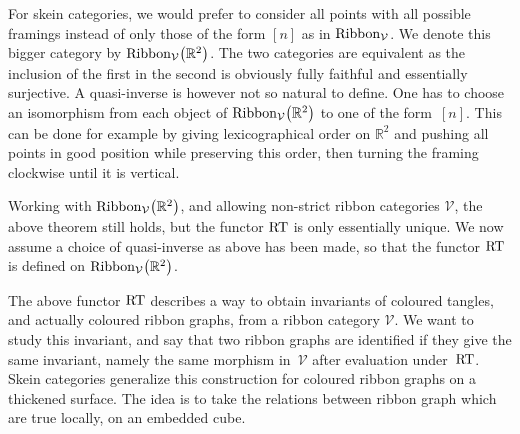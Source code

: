 \documentclass[pdftex]{sigma}%
\numberwithin{equation}{section}
\begin{document}
\begin{Remark}\label{rmkEqCatSkR2VV}
For skein categories, we would prefer to consider all points with all possible framings instead of only those of the form $[n]$ as in ${\rm Ribbon}_\mathcal{V}$. We denote this bigger category by ${\rm Ribbon}_\mathcal{V}\big(\mathbb{R}^2\big)$. The two categories are equivalent as the inclusion of the first in the second is obviously fully faithful and essentially surjective. A quasi-inverse is however not so natural to define. One has to choose an isomorphism from each object of ${\rm Ribbon}_\mathcal{V}\big(\mathbb{R}^2\big)$ to one of the form~$[n]$. This can be done for example by giving lexicographical order on $\mathbb{R}^2$ and pushing all points in good position while preserving this order, then turning the framing clockwise until it is vertical.

Working with ${\rm Ribbon}_\mathcal{V}\big(\mathbb{R}^2\big)$, and allowing non-strict ribbon categories $\mathcal{V}$, the above theorem still holds, but the functor ${\rm RT}$ is only essentially unique. We now assume a choice of quasi-inverse as above has been made, so that the functor ${\rm RT}$ is defined on ${\rm Ribbon}_\mathcal{V}\big(\mathbb{R}^2\big)$.
\end{Remark}

The above functor ${\rm RT}$ describes a way to obtain invariants of coloured tangles, and actually coloured ribbon graphs, from a ribbon category $\mathcal{V}$. We want to study this invariant, and say that two ribbon graphs are identified if they give the same invariant, namely the same morphism in~$\mathcal{V}$ after evaluation under~${\rm RT}$. Skein categories generalize this construction for coloured ribbon graphs on a thickened surface. The idea is to take the relations between ribbon graph which are true locally, on an embedded cube.
\end{document}
